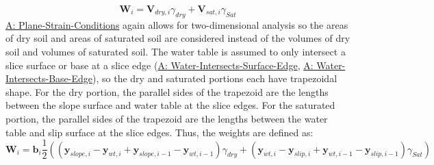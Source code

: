 \documentclass[12pt]{article}
\begin{document}
\begin{displaymath}
{\mathbf{W}}_{i}={\mathbf{V}_{dry,i}} {γ_{dry}}+{\mathbf{V}_{sat,i}} {γ_{Sat}}
\end{displaymath}
\hyperref[assumpPSC]{A: Plane-Strain-Conditions} again allows for two-dimensional analysis so the areas of dry soil and areas of saturated soil are considered instead of the volumes of dry soil and volumes of saturated soil. The water table is assumed to only intersect a slice surface or base at a slice edge (\hyperref[assumpWISE]{A: Water-Intersects-Surface-Edge}, \hyperref[assumpWIBE]{A: Water-Intersects-Base-Edge}), so the dry and saturated portions each have trapezoidal shape. For the dry portion, the parallel sides of the trapezoid are the lengths between the slope surface and water table at the slice edges. For the saturated portion, the parallel sides of the trapezoid are the lengths between the water table and slip surface at the slice edges. Thus, the weights are defined as:
\begin{displaymath}
{\mathbf{W}}_{i}={\mathbf{b}}_{i} \frac{1}{2} \left(\left({\mathbf{y}_{slope,i}}-{\mathbf{y}_{wt,i}}+{\mathbf{y}_{slope,i-1}}-{\mathbf{y}_{wt,i-1}}\right) {γ_{dry}}+\left({\mathbf{y}_{wt,i}}-{\mathbf{y}_{slip,i}}+{\mathbf{y}_{wt,i-1}}-{\mathbf{y}_{slip,i-1}}\right) {γ_{Sat}}\right)
\end{displaymath}
\par~
\end{document}
